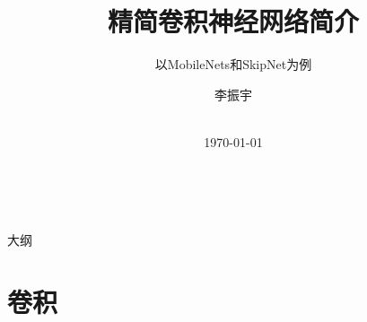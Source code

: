 \documentclass[UTF8, fontset=founder, aspectratio=43, 10pt, t]{ctexbeamer}
\begin{document}
	


\newcommand{\balA}[1][1]{BAL$^\mathup{I}_{#1:#1}$\xspace}
\newcommand{\unbalA}[1][n]{UNBAL$^\mathup{I}_{1:#1}$\xspace}
\newcommand{\balB}[1][1]{BAL$^\mathup{II}_{#1:#1}$\xspace}
\newcommand{\unbalB}[1][n]{UNBAL$^\mathup{II}_{#1:1}$\xspace}



\title{精简卷积神经网络简介}

\subtitle{以MobileNets和SkipNet为例}

\author[李振宇 唐呈俊 蔡国宝 符笑彬 李世杰]{%
	李振宇
} %


\date{%
	\\[\medskipamount]
	\textmd{\today}%
}






\begin{frame}[standout]{~}
	
	\titlepage%
	
\end{frame}


\begin{frame}[standout]{大纲}
	
	\medskip
	\tableofcontents
	
\end{frame}






\section{卷积}
\end{document}

